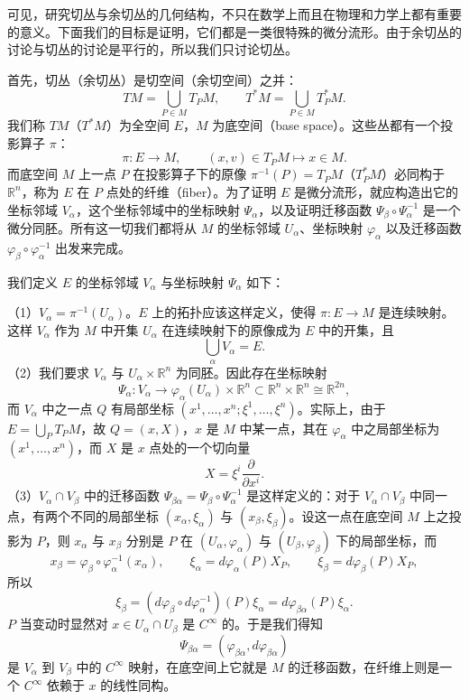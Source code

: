 可见，研究切丛与余切丛的几何结构，不只在数学上而且在物理和力学上都有重要的意义。下面我们的目标是证明，它们都是一类很特殊的微分流形。由于余切丛的讨论与切丛的讨论是平行的，所以我们只讨论切丛。

首先，切丛（余切丛）是切空间（余切空间）之并：
\begin{equation}
 TM=\bigcup_{P\in M}T_PM,
 \qquad
 T^*M=\bigcup_{P\in M}T_P^*M.
 \tag{30}
\end{equation}
我们称 $TM$（$T^*M$）为全空间 $E$，$M$ 为底空间（base space）。这些丛都有一个投影算子 $\pi$：
\[
 \pi:E\to M,
 \qquad (x,v)\in T_PM\mapsto x\in M.
\]
而底空间 $M$ 上一点 $P$ 在投影算子下的原像 $\pi^{-1}(P)=T_PM$（$T_P^*M$）必同构于 $\mathbb R^n$，称为 $E$ 在 $P$ 点处的纤维（fiber）。为了证明 $E$ 是微分流形，就应构造出它的坐标邻域 $V_\alpha$，这个坐标邻域中的坐标映射 $\Psi_\alpha$，以及证明迁移函数 $\Psi_\beta\circ\Psi_\alpha^{-1}$ 是一个微分同胚。所有这一切我们都将从 $M$ 的坐标邻域 $U_\alpha$、坐标映射 $\varphi_\alpha$ 以及迁移函数 $\varphi_\beta\circ\varphi_\alpha^{-1}$ 出发来完成。

我们定义 $E$ 的坐标邻域 $V_\alpha$ 与坐标映射 $\Psi_\alpha$ 如下：

（1）$V_\alpha=\pi^{-1}(U_\alpha)$。$E$ 上的拓扑应该这样定义，使得 $\pi:E\to M$ 是连续映射。这样 $V_\alpha$ 作为 $M$ 中开集 $U_\alpha$ 在连续映射下的原像成为 $E$ 中的开集，且
\begin{equation}
 \bigcup_\alpha V_\alpha=E.
 \tag{31}
\end{equation}
（2）我们要求 $V_\alpha$ 与 $U_\alpha\times\mathbb R^n$ 为同胚。因此存在坐标映射
\[
 \Psi_\alpha:V_\alpha\to\varphi_\alpha(U_\alpha)\times\mathbb R^n
 \subset\mathbb R^n\times\mathbb R^n\cong\mathbb R^{2n},
\]
而 $V_\alpha$ 中之一点 $Q$ 有局部坐标 $(x^1,\ldots,x^n;\xi^1,\ldots,\xi^n)$。实际上，由于 $E=\bigcup_PT_PM$，故 $Q=(x,X)$，$x$ 是 $M$ 中某一点，其在 $\varphi_\alpha$ 中之局部坐标为 $(x^1,\ldots,x^n)$，而 $X$ 是 $x$ 点处的一个切向量
\[
 X=\xi^i\frac{\partial}{\partial x^i}.
\]
（3）$V_\alpha\cap V_\beta$ 中的迁移函数 $\Psi_{\beta\alpha}=\Psi_\beta\circ\Psi_\alpha^{-1}$ 是这样定义的：对于 $V_\alpha\cap V_\beta$ 中同一点，有两个不同的局部坐标 $(x_\alpha,\xi_\alpha)$ 与 $(x_\beta,\xi_\beta)$。设这一点在底空间 $M$ 上之投影为 $P$，则 $x_\alpha$ 与 $x_\beta$ 分别是 $P$ 在 $(U_\alpha,\varphi_\alpha)$ 与 $(U_\beta,\varphi_\beta)$ 下的局部坐标，而
\[
 x_\beta=\varphi_\beta\circ\varphi_\alpha^{-1}(x_\alpha),
 \qquad
 \xi_\alpha=d\varphi_\alpha(P)X_P,
 \qquad
 \xi_\beta=d\varphi_\beta(P)X_P,
\]
所以
\[
 \xi_\beta=(d\varphi_\beta\circ d\varphi_\alpha^{-1})(P)\xi_\alpha
 =d\varphi_{\beta\alpha}(P)\xi_\alpha.
\]
$P$ 当变动时显然对 $x\in U_\alpha\cap U_\beta$ 是 $C^\infty$ 的。于是我们得知
\[
 \Psi_{\beta\alpha}=(\varphi_{\beta\alpha},d\varphi_{\beta\alpha})
\]
是 $V_\alpha$ 到 $V_\beta$ 中的 $C^\infty$ 映射，在底空间上它就是 $M$ 的迁移函数，在纤维上则是一个 $C^\infty$ 依赖于 $x$ 的线性同构。

